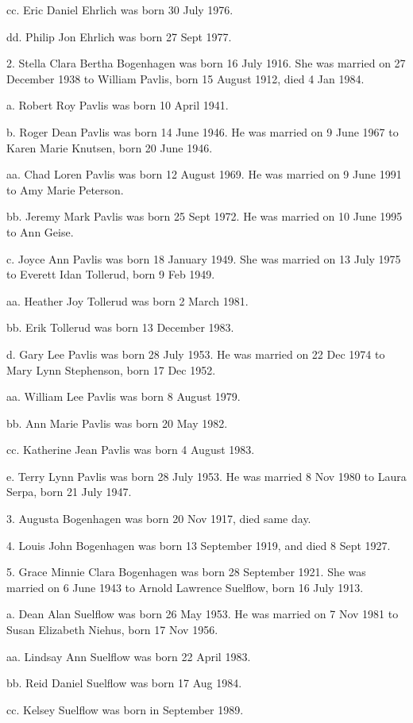 \documentclass[a4paper]{article}
\begin{document}
cc. Eric Daniel Ehrlich was born 30 July 1976.

dd. Philip Jon Ehrlich was born 27 Sept 1977.

2. Stella Clara Bertha Bogenhagen was born 16 July 1916.  She was married on 27 December 1938 to William Pavlis, born 15 August 1912, died 4 Jan 1984.

a. Robert Roy Pavlis was born 10 April 1941.

b. Roger Dean Pavlis was born 14 June 1946.  He was married on 9 June 1967 to Karen Marie Knutsen, born 20 June 1946.
 
aa. Chad Loren Pavlis was born 12 August 1969.  He was married on 9 June 1991 to Amy Marie Peterson.

bb. Jeremy Mark Pavlis was born 25 Sept 1972.  He was married on 10 June 1995 to Ann Geise.

c. Joyce Ann Pavlis was born 18 January 1949.  She was married on 13 July 1975 to Everett Idan Tollerud, born 9 Feb 1949.

aa. Heather Joy Tollerud was born 2 March 1981.

bb. Erik Tollerud was born 13 December 1983.  

d. Gary Lee Pavlis was born 28 July 1953.  He was married on 22 Dec 1974 to Mary Lynn Stephenson, born 17 Dec 1952.

aa. William Lee Pavlis was born 8 August 1979.

bb. Ann Marie Pavlis was born 20 May 1982.

cc. Katherine Jean Pavlis was born 4 August 1983.

e. Terry Lynn Pavlis was born 28 July 1953.  He was married 8 Nov 1980 to Laura Serpa, born 21 July 1947.

3. Augusta Bogenhagen was born 20 Nov 1917, died same day.

4. Louis John Bogenhagen was born 13 September 1919, and died 8 Sept 1927.

5. Grace Minnie Clara Bogenhagen was born 28 September 1921.  She was married on 6 June 1943 to Arnold Lawrence Suelflow, born 16 July 1913.

a. Dean Alan Suelflow was born 26 May 1953.  He was married on 7 Nov 1981 to Susan Elizabeth Niehus, born 17 Nov 1956.

aa. Lindsay Ann Suelflow was born 22 April 1983.

bb. Reid Daniel Suelflow was born 17 Aug 1984.

cc. Kelsey Suelflow was born in September 1989.
\end{document}
